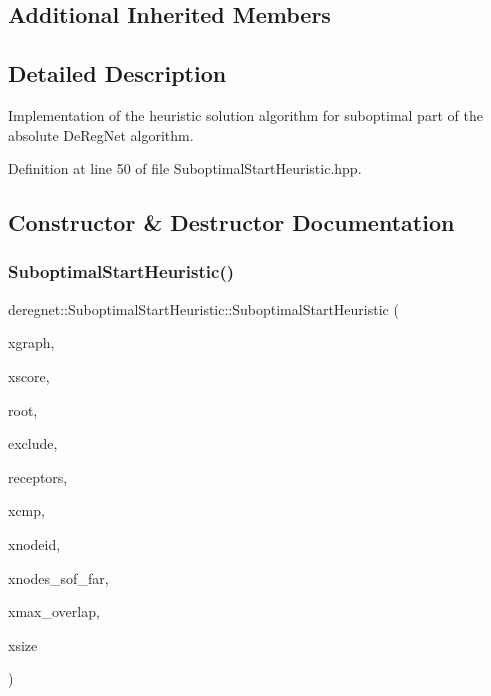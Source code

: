 \subsection*{Additional Inherited Members}


\subsection{Detailed Description}
Implementation of the heuristic solution algorithm for suboptimal part of the absolute De\+Reg\+Net algorithm. 

Definition at line 50 of file Suboptimal\+Start\+Heuristic.\+hpp.



\subsection{Constructor \& Destructor Documentation}
\mbox{\label{classderegnet_1_1SuboptimalStartHeuristic_a3a05d150d544a21523f7babcf4910a45}} 
\subsubsection{\texorpdfstring{Suboptimal\+Start\+Heuristic()}{SuboptimalStartHeuristic()}}
{\footnotesize\ttfamily deregnet\+::\+Suboptimal\+Start\+Heuristic\+::\+Suboptimal\+Start\+Heuristic (\begin{DoxyParamCaption}\item[{\hyperlink{namespacederegnet_a55b76c55bbabc682cbc61f8b9948799e}{Graph} $\ast$}]{xgraph,  }\item[{\hyperlink{namespacederegnet_ae102b707ae1d6f83c639ece5e0dd5658}{Node\+Map}$<$ double $>$ $\ast$}]{xscore,  }\item[{\hyperlink{namespacederegnet_a744bad34f2de9856d36715a445f027f3}{Node} $\ast$}]{root,  }\item[{std\+::set$<$ \hyperlink{namespacederegnet_a744bad34f2de9856d36715a445f027f3}{Node} $>$ $\ast$}]{exclude,  }\item[{std\+::set$<$ \hyperlink{namespacederegnet_a744bad34f2de9856d36715a445f027f3}{Node} $>$ $\ast$}]{receptors,  }\item[{std\+::function$<$ bool(double, double)$>$}]{xcmp,  }\item[{\hyperlink{namespacederegnet_ae102b707ae1d6f83c639ece5e0dd5658}{Node\+Map}$<$ std\+::string $>$ $\ast$}]{xnodeid,  }\item[{std\+::set$<$ std\+::string $>$ $\ast$}]{xnodes\+\_\+sof\+\_\+far,  }\item[{double}]{xmax\+\_\+overlap,  }\item[{int}]{xsize }\end{DoxyParamCaption})}


